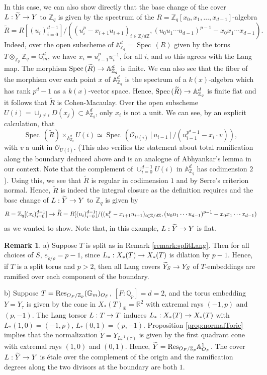\documentclass[reqno, 10pt]{amsart}
\makeatletter
\newcommand{\BA}{\ensuremath{\mathbb {A}}\xspace}
\newcommand{\BG}{\ensuremath{\mathbb {G}}\xspace}
\newcommand{\BQ}{\ensuremath{\mathbb {Q}}\xspace}
\newcommand{\BR}{\ensuremath{\mathbb {R}}\xspace}
\newcommand{\BZ}{\ensuremath{\mathbb {Z}}\xspace}
\newcommand{\CO}{\ensuremath{\mathcal {O}}\xspace}
\DeclareMathOperator{\Spec}{Spec\,}
\newcommand{\wt}{\widetilde}
\theoremstyle{definition}
\newtheorem{remark}[subsubsection]{Remark}
\numberwithin{equation}{subsection}
\numberwithin{subsubsection}{subsection}
\renewcommand{\to}{%
   \ifbool{@display}{\longrightarrow}{\rightarrow}%
   }
\makeatother
\begin{document}
 
In this case, we can also show directly that the base change of the cover $L: \wt Y\to Y$  to $\BZ_q$ is given by the spectrum  of the $R= \BZ_q[x_0,x_1,\ldots, x_{d-1}]$-algebra 
 \[
\wt R= R[(u_i)_{i=0}^{d-1} ]/((u_{i}^p-x_{i+1}u_{i+1})_{i\in \BZ/d\BZ}, (u_0u_1\cdots u_{d-1})^{p-1}-x_0x_1\cdots x_{d-1}).
 \]
Indeed, over the open subscheme   of $\BA^d_{\BZ_q}=\Spec( R)$ given by the torus $T\otimes_{\BZ_p}\BZ_q=\BG_m^d$, we have $x_i=u_{i-1}^pu_i^{-1}$, for all $i$, and so this agrees with the  Lang map.
The morphism $\Spec(\wt R)\to \BA^d_{\BZ_q}$  is finite. We can also see that the fiber of the morphism over each point $x$ of $\BA^d_{\BZ_q}$ is the spectrum of a $k(x)$-algebra which has rank $p^d-1$ as a $k(x)$-vector space. Hence, $\Spec(\wt R)\to \BA^d_{\BZ_q}$ is  finite flat and it follows that $\wt R$ is Cohen-Macaulay. Over the open subscheme  $U(i)=\cup_{j\neq i}D(x_j)\subset \BA^d_{\BZ_q}$, only $x_i$ is not a unit. We can see, by an explicit calculation,  that 
\[
\Spec(\wt R)\times_{\BA^d_{\BZ_q}}U(i)\simeq \underline{\Spec}(\CO_{U(i)}[u_{i-1}]/(u_{i-1}^{p^d-1}-x_i\cdot v)),
\]
 with $v$ a unit in $\CO_{U(i)}$. (This also verifies the statement about total ramification along the boundary deduced above and is an analogue of Abhyankar's lemma in our context. Note that the complement of $\cup_{i=0}^{d-1} U(i)$ in $\BA^d_{\BZ_q}$ has codimension $2$).
Using this, we see  that $\wt R$ 
 is regular in codimension $1$ and by Serre's criterion normal. Hence,  $\wt R$ is indeed the integral closure as the definition requires and the base change of $ L: {\wt Y} \to   Y$ to $\BZ_q$ is given by
 \[
 R=\BZ_q[(x_i)_{i=0}^{d-1} ]\to  \wt R=R[(u_i)_{i=0}^{d-1} ]/((u_{i}^p-x_{i+1}u_{i+1})_{i\in \BZ/d\BZ}, (u_0u_1\cdots u_{d-1})^{p-1}-x_0x_1\cdots x_{d-1})
 \]
 as we wanted to show. Note that, in this example, $L:\wt Y\to Y$ is flat.

   \begin{remark}\label{rem:ramify}
a) Suppose $T$ is split as in Remark \ref{remark:splitLang}. Then for all choices of $S$, $e_{\wt\rho/\rho}=p-1$, since 
 $L_*: X_*(T)\to X_*(T)$ is dilation by $p-1$. Hence, if $T$ is a split torus and $p>2$, then all Lang covers $\wt Y_S\to Y_S$
 of $T$-embeddings are ramified over each component of the boundary. 
 
 b) Suppose $T={\rm Res}_{O_F/\BZ_p}(\BG_m)_{O_F}$, $[F:\BQ_p]=d=2$, and the torus embedding $Y=Y_\tau$ is given by the cone in $X_*(T)_\BR=\BR^2$ with extremal rays $(-1,p)$ and $(p,-1)$. The Lang torsor $L: T\to T$ induces $L_*: X_*(T)\to X_*(T)$ with $L_*(1,0)=(-1,p)$, $L_*(0,1)=(p, -1)$. Proposition \ref{prop:normalToric} implies that the normalization $\wt Y=Y_{L^{-1}_*(\tau)}$ is given by the first quadrant cone with extremal rays $(1,0)$ and $(0,1)$.
 Hence, $\wt Y={\rm Res}_{O_F/\BZ_p}\BA^1_{O_F}$. The cover $L: \wt Y\to Y$ is \'etale over the complement of the origin and the ramification degrees along the two divisors at the boundary are both $1$. 
\end{remark}
\end{document}
